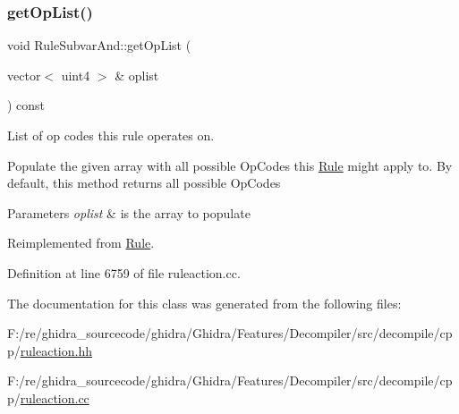 \subsubsection{\texorpdfstring{getOpList()}{getOpList()}}
{\footnotesize\ttfamily void Rule\+Subvar\+And\+::get\+Op\+List (\begin{DoxyParamCaption}\item[{vector$<$ uint4 $>$ \&}]{oplist }\end{DoxyParamCaption}) const\hspace{0.3cm}{\ttfamily [virtual]}}



List of op codes this rule operates on. 

Populate the given array with all possible Op\+Codes this \mbox{\hyperlink{class_rule}{Rule}} might apply to. By default, this method returns all possible Op\+Codes 
\begin{DoxyParams}{Parameters}
{\em oplist} & is the array to populate \\
\hline
\end{DoxyParams}


Reimplemented from \mbox{\hyperlink{class_rule_a4023bfc7825de0ab866790551856d10e}{Rule}}.



Definition at line 6759 of file ruleaction.\+cc.



The documentation for this class was generated from the following files\+:\begin{DoxyCompactItemize}
\item 
F\+:/re/ghidra\+\_\+sourcecode/ghidra/\+Ghidra/\+Features/\+Decompiler/src/decompile/cpp/\mbox{\hyperlink{ruleaction_8hh}{ruleaction.\+hh}}\item 
F\+:/re/ghidra\+\_\+sourcecode/ghidra/\+Ghidra/\+Features/\+Decompiler/src/decompile/cpp/\mbox{\hyperlink{ruleaction_8cc}{ruleaction.\+cc}}\end{DoxyCompactItemize}
